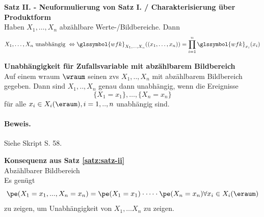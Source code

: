 \begin{satz}
    \label{satz:satz-ii}
    \textbf{Satz II.  - Neuformulierung von Satz I. / Charakterisierung über Produktform}    \\
    Haben $X_1, \dots, X_n$ abzählbare Werte-/Bildbereiche.
    Dann
    \[
        X_1, \dots, X_n  \text{ unabhängig } \Leftrightarrow \glssymbol{wfk}_{X_1, \dots, X_n} ((x_1, \dots, x_n)) = \prod^n_{i=1} \glssymbol{wfk}_{x_i}(x_i)
    \]
\end{satz}


\begin{theo}
    \label{theo:unabhaengigkeit-zv-abzaehlbar}
    \textbf{Unabhängigkeit für Zufallsvariable mit abzählbarem Bildbereich}  \\
    Auf einem \gls{wraum} $\wraum$ seinen \glspl{zv} $X_1, .., X_n$ mit abzählbarem Bildbereich gegeben.
    Dann sind  $X_1, .., X_n$ genau dann unabhängig, wenn die Ereignisse
    \[
        \{X_1 = x_1\}, \dots , \{X_n = x_n\}
    \]
    für alle $x_i \in X_i(\eraum), i = 1, .., n$ unabhängig sind.

    \paragraph{Beweis.} Siehe Skript S. 58.
\end{theo}



\begin{kor}
    \textbf{Konsequenz aus Satz \ref{satz:satz-ii}}   \\
    Abzählbarer Bildbereich \\
    Es genügt
    \[\pe(X_1 = x_1 , ..., X_n = x_n) = \pe (X_1 = x_1) \cdot \dots \cdot \pe(X_n = x_n) \forall x_i \in X_i(\eraum)\]
    zu zeigen, um Unabhängigkeit
    von $X_1, \dots X_n $ zu zeigen.
\end{kor}

